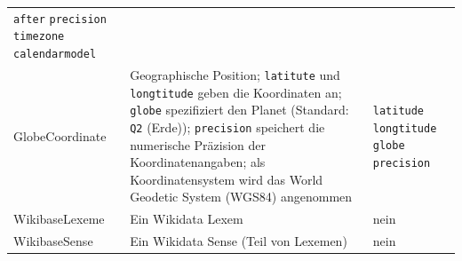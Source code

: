 \begin{table}
\begin{adjustwidth}{-1.5cm}{-0.5cm}
\begin{minipage}{\textwidth}
\begin{tabular}{l p{} p{}}
                                                                                                                                                                                         \verb|after|\newline{}
                                                                                                                                                                                         \verb|precision|\newline{}
                                                                                                                                                                                         \verb|timezone|\newline{}
                                                                                                                                                                                         \verb|calendarmodel| \\
      GlobeCoordinate  & Geographische Position; \verb|latitute| und \verb|longtitude| geben die Koordinaten an; \verb|globe| spezifiziert den Planet (Standard: \verb|Q2| (Erde));
                         \verb|precision| speichert die numerische Präzision der Koordinatenangaben; als Koordinatensystem wird das World Geodetic System (WGS84) angenommen           & \verb|latitude|\newline{}
                                                                                                                                                                                         \verb|longtitude|\newline{}
                                                                                                                                                                                         \verb|globe|\newline{}
                                                                                                                                                                                         \verb|precision| \\
      WikibaseLexeme   & Ein Wikidata Lexem                                                                                                                                           & nein \\
      WikibaseSense    & Ein Wikidata Sense (Teil von Lexemen)                                                                                                                         & nein \\

\end{tabular}
\end{minipage}
\end{adjustwidth}
\end{table}
